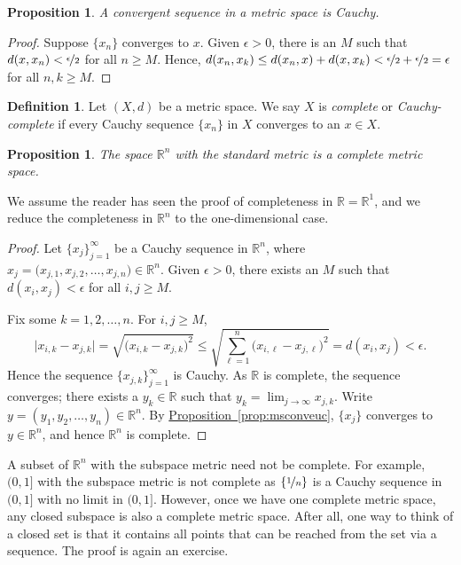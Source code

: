 \documentclass[12pt,openany]{book}
\newcommand{\R}{{\mathbb{R}}}
\newcommand{\myindex}[1]{#1\index{#1}}
\theoremstyle{plain}
\newtheorem{prop}[thm]{Proposition}
\theoremstyle{remark}
\theoremstyle{definition}
\newtheorem{defn}[thm]{Definition}
\theoremstyle{exercise}
\theoremstyle{example}
\newcommand{\propref}[1]{\hyperref[#1]{Proposition~\ref*{#1}}}
\begin{document}
\begin{prop}
A convergent sequence in a metric space is Cauchy.
\end{prop}

\begin{proof}
Suppose $\{ x_n \}$ converges to $x$.
Given $\epsilon > 0$, there is an $M$ such that
$d(x,x_n) < \nicefrac{\epsilon}{2}$ for all $n \geq M$.
Hence,
$d(x_n,x_k) \leq d(x_n,x) + d(x,x_k) < \nicefrac{\epsilon}{2} +
\nicefrac{\epsilon}{2} = \epsilon$
for all $n,k \geq M$.
\end{proof}

\begin{defn}
Let $(X,d)$ be a metric space.  We say $X$ is
\emph{\myindex{complete}} or \emph{\myindex{Cauchy-complete}}
if every Cauchy sequence $\{ x_n \}$ in $X$
converges to an $x \in X$.
\end{defn}

\begin{prop}
The space $\R^n$ with the standard metric is a complete metric space.
\end{prop}

We assume the reader has seen the proof of completeness in $\R = \R^1$,
and we reduce the completeness in $\R^n$ to the one-dimensional case.

\begin{proof}
Let $\{ x_j \}_{j=1}^\infty$ be a Cauchy sequence
in $\R^n$, where $x_j = \bigl(x_{j,1},x_{j,2},\ldots,x_{j,n}\bigr) \in \R^n$.
Given $\epsilon > 0$, there exists an $M$ such that
$d(x_i,x_j) < \epsilon$
for all
$i,j \geq M$.

Fix some $k=1,2,\ldots,n$.  For $i,j \geq M$,
\begin{equation*}
\bigl\lvert x_{i,k} - x_{j,k} \bigr\rvert
=
\sqrt{{\bigl(x_{i,k} - x_{j,k}\bigr)}^2}
\leq
\sqrt{\sum_{\ell=1}^n {\bigl(x_{i,\ell}-x_{j,\ell}\bigr)}^2}
= d(x_i,x_j) < \epsilon .
\end{equation*}
Hence the sequence $\{ x_{j,k} \}_{j=1}^\infty$ is Cauchy.  As $\R$ is
complete, the sequence converges; there exists a $y_k \in \R$ such that
$y_k = \lim_{j\to\infty} x_{j,k}$.
Write $y = (y_1,y_2,\ldots,y_n) \in \R^n$.
By \propref{prop:msconveuc}, $\{ x_j \}$ converges
to $y \in \R^n$, and hence $\R^n$ is complete.
\end{proof}

A subset of $\R^n$ with the subspace metric need not be
complete.  For example, $(0,1]$ with the subspace metric is not
complete as $\{ \nicefrac{1}{n} \}$ is a Cauchy sequence in $(0,1]$
with no limit in $(0,1]$.
However,
once we have one complete metric space, any closed subspace is
also a complete metric space.  After all, one way
to think of a closed set is that it contains all points
that can be reached from the set via a sequence.
The proof is again an exercise.
\end{document}
